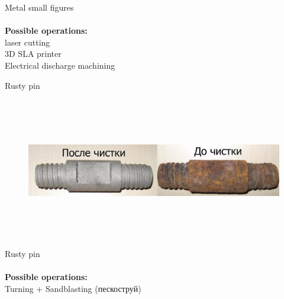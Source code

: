 \documentclass[aspectratio=169]{beamer}
\newcommand{\fbckg}[1]{\usebackgroundtemplate{\texttt{[image: \#1]}}}%
\begin{document}
\begin{frame}[c]{Metal small figures}
    \framesubtitle{}
        \LARGE \centering
        \textbf{Possible operations: } \\ 
        laser cutting\\
        3D SLA printer\\
        Electrical discharge machining
    \end{frame}

\begin{frame}[c]{Rusty pin}
\framesubtitle{}
    \vspace{-0.6cm}
    \begin{figure}[H]
        \centering\includegraphics[height=6cm,width=1\textwidth,keepaspectratio]{sand_blazing.jpg}
        \label{fig:sand_blazing.jpg}
    \end{figure}
\end{frame}

\begin{frame}[c]{Rusty pin}
    \framesubtitle{}
        \LARGE \centering
        \textbf{Possible operations: } \\ 
        Turning + Sandblasting (пескоструй)\\
    \end{frame}

\fbckg{fibeamer/figs/last_page.png}
\frame[plain]{}
\end{document}
